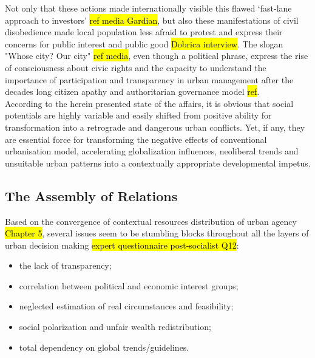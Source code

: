 \documentclass[11pt]{report}
\begin{document}
Not only that these actions made internationally visible this flawed ‘fast-lane approach to investors’ \hl{ref media Gardian}, but also these manifestations of civil disobedience made local population less afraid to protest and express their concerns for public interest and public good \hl{Dobrica interview}.
The slogan "Whose city? Our city" \hl{ref media}, even though a political phrase, express the rise of consciousness about civic rights and the capacity to understand the importance of participation and transparency in urban management after the decades long citizen apathy and authoritarian governance model \hl{ref}.
\\
According to the herein presented state of the affairs, it is obvious that social potentials are highly variable and easily shifted from positive ability for transformation into a retrograde and dangerous urban conflicts. 
Yet, if any, they are essential force for transforming the negative effects of conventional urbanisation model, accelerating globalization influences, neoliberal trends and unsuitable urban patterns into a contextually appropriate developmental impetus. 

\subsection{The Assembly of Relations}

Based on the convergence of contextual resources distribution of urban agency \hl{Chapter 5}, several issues seem to be stumbling blocks throughout all the layers of urban decision making \hl{expert questionnaire post-socialist Q12}:
\begin{itemize}
\item the lack of transparency;
\item correlation between political and economic interest groups;
\item neglected estimation of real circumstances and feasibility;
\item social polarization and unfair wealth redistribution;
\item total dependency on global trends/guidelines.
\end{itemize}
\end{document}
